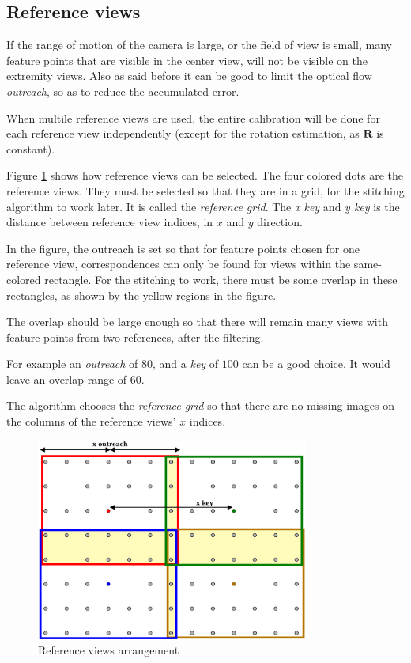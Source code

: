 \documentclass{scrreprt}
\newcommand{\matr}[1]{\mathbf{#1}}
\begin{document}
\subsection{Reference views}
If the range of motion of the camera is large, or the field of view is small, many feature points that are visible in the center view, will not be visible on the extremity views. Also as said before it can be good to limit the optical flow \emph{outreach}, so as to reduce the accumulated error.

When multile reference views are used, the entire calibration will be done for each reference view independently (except for the rotation estimation, as $\matr{R}$ is constant).

Figure \ref{fig:refview} shows how reference views can be selected. The four colored dots are the reference views. They must be selected so that they are in a grid, for the stitching algorithm to work later. It is called the \emph{reference grid}. The \emph{x key} and \emph{y key} is the distance between reference view indices, in $x$ and $y$ direction.

In the figure, the outreach is set so that for feature points chosen for one reference view, correspondences can only be found for views within the same-colored rectangle. For the stitching to work, there must be some overlap in these rectangles, as shown by the yellow regions in the figure. 

The overlap should be large enough so that there will remain many views with feature points from two references, after the filtering.

For example an \emph{outreach} of $80$, and a \emph{key} of $100$ can be a good choice. It would leave an overlap range of $60$.

The algorithm chooses the \emph{reference grid} so that there are no missing images on the columns of the reference views' $x$ indices.

\begin{figure}
\centering
\includegraphics[width=0.8\textwidth]{refview.pdf}
\caption{Reference views arrangement}
\label{fig:refview}
\end{figure}
\end{document}
